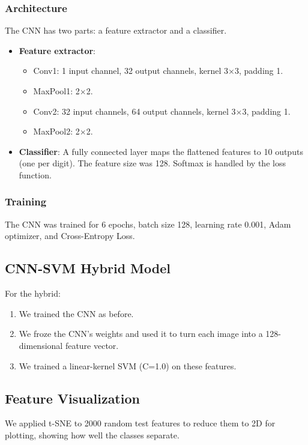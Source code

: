 \documentclass{article}
\begin{document}
\subsubsection{Architecture}
The CNN has two parts: a feature extractor and a classifier.
\begin{itemize}
    \item \textbf{Feature extractor}: 
    \begin{itemize}
        \item Conv1: 1 input channel, 32 output channels, kernel 3$\times$3, padding 1.
        \item MaxPool1: 2$\times$2.
        \item Conv2: 32 input channels, 64 output channels, kernel 3$\times$3, padding 1.
        \item MaxPool2: 2$\times$2.
    \end{itemize}
    \item \textbf{Classifier}: A fully connected layer maps the flattened features to 10 outputs (one per digit). The feature size was 128. Softmax is handled by the loss function.
\end{itemize}

\subsubsection{Training}
The CNN was trained for 6 epochs, batch size 128, learning rate 0.001, Adam optimizer, and Cross-Entropy Loss.

\subsection{CNN-SVM Hybrid Model}
For the hybrid:
\begin{enumerate}
    \item We trained the CNN as before.
    \item We froze the CNN’s weights and used it to turn each image into a 128-dimensional feature vector.
    \item We trained a linear-kernel SVM (C=1.0) on these features.
\end{enumerate}

\subsection{Feature Visualization}
We applied t-SNE to 2000 random test features to reduce them to 2D for plotting, showing how well the classes separate.
\end{document}
